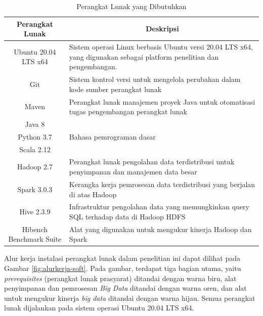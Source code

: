 \begin{table}[h!]
	\centering
	\caption{Perangkat Lunak yang Dibutuhkan}
		\begin{tabular}{|c|p{9cm}|}
		\hline
			\textbf{Perangkat Lunak} & \multicolumn{1}{c|}{\textbf{Deskripsi}}                                                                                \\ \hline
			Ubuntu 20.04 LTS x64     & Sistem operasi Linux berbasis Ubuntu versi 20.04 LTS x64, yang digunakan sebagai platform penelitian dan pengembangan. \\ \hline
			Git                      & Sistem kontrol versi untuk mengelola perubahan dalam kode sumber perangkat lunak                                       \\ \hline
			Maven                    & Perangkat lunak manajemen proyek Java untuk otomatisasi tugas pengembangan perangkat lunak                             \\ \hline
			Java 8                   & \multirow{3}{*}{Bahasa pemrograman dasar}                                 \\ \cline{1-1}
			Python 3.7               &                                                                                                                        \\ \cline{1-1}
			Scala 2.12               &                                                                                                                        \\ \hline
			Hadoop 2.7               & Perangkat lunak pengolahan data terdistribusi untuk penyimpanan dan manajemen data besar                               \\ \hline
			Spark 3.0.3              & Kerangka kerja pemrosesan data terdistribusi yang berjalan di atas Hadoop                                              \\ \hline
			Hive 2.3.9               & Infrastruktur pengolahan data yang memungkinkan query SQL terhadap data di Hadoop HDFS                                 \\ \hline
			Hibench Benchmark Suite  & Alat yang digunakan untuk mengukur kinerja Hadoop dan Spark                                                            \\ \hline
		\end{tabular}
	\label{table:software-needs}
\end{table}

Alur kerja instalasi perangkat lunak dalam penelitian ini dapat dilihat pada Gambar \ref{fig:alurkerja-soft}. Pada gambar, terdapat tiga bagian utama, yaitu \textit{prerequisites} (perangkat lunak prasyarat) ditandai dengan warna biru, alat penyimpanan dan pemrosesan \textit{Big Data} ditandai dengan warna oren, dan alat untuk mengukur kinerja \textit{big data} ditandai dengan warna hijau. Semua perangkat lunak dijalankan pada sistem operasi Ubuntu 20.04 LTS x64.


